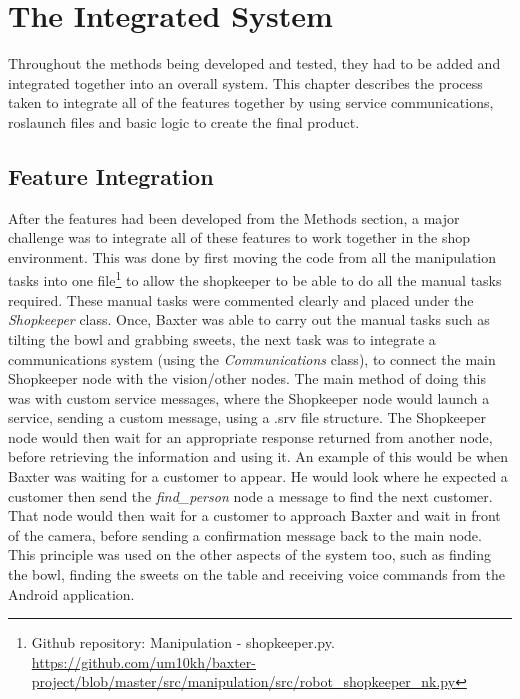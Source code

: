 \chapter{The Integrated System}
\label{chapter5}
Throughout the methods being developed and tested, they had to be added and integrated together into an overall system. This chapter describes the process taken to integrate all of the features together by using service communications, roslaunch files and basic logic to create the final product.
\section{Feature Integration}
After the features had been developed from the Methods section, a major challenge was to integrate all of these features to work together in the shop environment. This was done by first moving the code from all the manipulation tasks into one file\footnote{Github repository: Manipulation - shopkeeper.py. \url{https://github.com/um10kh/baxter-project/blob/master/src/manipulation/src/robot_shopkeeper_nk.py}} to allow the shopkeeper to be able to do all the manual tasks required. These manual tasks were commented clearly and placed under the \textit{Shopkeeper} class.
\newline\newline
Once, Baxter was able to carry out the manual tasks such as tilting the bowl and grabbing sweets, the next task was to integrate a communications system (using the \textit{Communications} class), to connect the main Shopkeeper node with the vision/other nodes. The main method of doing this was with custom service messages, where the Shopkeeper node would launch a service, sending a custom message, using a .srv file structure. The Shopkeeper node would then wait for an appropriate response returned from another node, before retrieving the information and using it. An example of this would be when Baxter was waiting for a customer to appear. He would look where he expected a customer then send the \textit{find\_person} node a message to find the next customer. That node would then wait for a customer to approach Baxter and wait in front of the camera, before sending a confirmation message back to the main node. This principle was used on the other aspects of the system too, such as finding the bowl, finding the sweets on the table and receiving voice commands from the Android application.
